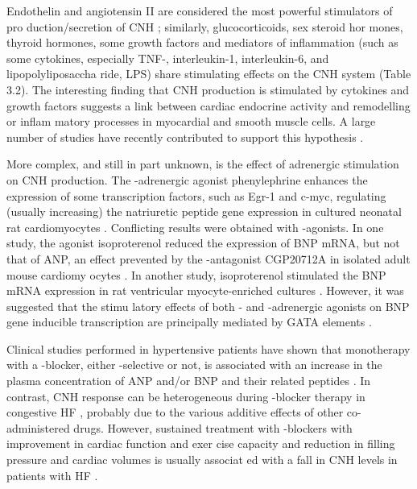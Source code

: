 \documentclass[14pt,a4paper,onecolumn]{extarticle}
\begin{document}
Endothelin and angiotensin II are considered the most powerful stimulators of pro duction/secretion of CNH \citep{12} \citep{13} \citep{18} \citep{22}; similarly, glucocorticoids, sex steroid hor mones, thyroid hormones, some growth factors and mediators of inflammation (such as some cytokines, especially TNF-\alpha, interleukin-1, interleukin-6, and lipopolyliposaccha ride, LPS) share stimulating effects on the CNH system \citep{12} \citep{13} \citep{18} \citep{22} \citep{36} \citep{48} \citep{49} \citep{50} \citep{51} \citep{52} \citep{53} \citep{54} \citep{55} \citep{56} \citep{57} (Table 3.2). The interesting finding that CNH production is stimulated by cytokines and growth factors suggests a link between cardiac endocrine activity and remodelling or inflam matory processes in myocardial and smooth muscle cells. A large number of studies have recently contributed to support this hypothesis \citep{33} \citep{34} \citep{35} \citep{36} \citep{50} \citep{51} \citep{52} \citep{53} \citep{56} \citep{57} \citep{58} \citep{59} \citep{60} \citep{61} \citep{62}.

More complex, and still in part unknown, is the effect of adrenergic stimulation on CNH production. The  -adrenergic agonist phenylephrine enhances the expression of some transcription factors, such as Egr-1 and c-myc, regulating (usually increasing) the natriuretic peptide gene expression in cultured neonatal rat cardiomyocytes \citep{12} \citep{13} \citep{18} \citep{63} \citep{64} \citep{65} \citep{66}. Conflicting results were obtained with \beta-agonists. In one study, the \beta agonist isoproterenol reduced the expression of BNP mRNA, but not that of ANP, an effect prevented by the  -antagonist CGP20712A in isolated adult mouse cardiomy ocytes \citep{67}. In another study, isoproterenol stimulated the BNP mRNA expression in rat ventricular myocyte-enriched cultures \citep{68}. However, it was suggested that the stimu latory effects of both \alpha- and \beta-adrenergic agonists on BNP gene inducible transcription are principally mediated by GATA elements \citep{22} \citep{23}.

Clinical studies performed in hypertensive patients have shown that monotherapy with a \beta-blocker, either  -selective or not, is associated with an increase in the plasma concentration of ANP and/or BNP and their related peptides \citep{69} \citep{70} \citep{71}. In contrast, CNH response can be heterogeneous during \beta-blocker therapy in congestive HF \citep{28} \citep{72}, probably due to the various additive effects of other co-administered drugs. However, sustained treatment with \beta-blockers with improvement in cardiac function and exer cise capacity and reduction in filling pressure and cardiac volumes is usually associat ed with a fall in CNH levels in patients with HF \citep{28} \citep{73} \citep{74}.
\end{document}

